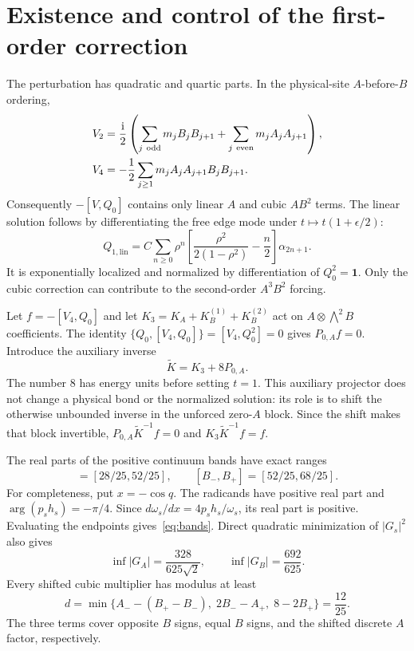\documentclass[11pt,a4paper]{article}
\newcommand{\ii}{\mathrm{i}}
\newcommand{\Id}{\mathbf{1}}
\begin{document}
\section{Existence and control of the first-order correction}
The perturbation has quadratic and quartic parts. In the physical-site
$A$-before-$B$ ordering,
\begin{align}
 V_2&=\frac{\ii}{2}\left(\sum_{j\ \text{odd}}m_j B_jB_{j+1}
                 +\sum_{j\ \text{even}}m_j A_jA_{j+1}\right),\notag\\
 V_4&=-\frac12\sum_{j\geq1}m_j A_jA_{j+1}B_jB_{j+1}.\label{eq:v4}
\end{align}
Consequently $-[V,Q_0]$ contains only linear $A$ and cubic $AB^2$ terms.
The linear solution follows by differentiating the free edge mode under
$t\mapsto t(1+\epsilon/2)$:
\begin{equation}
 Q_{1,\mathrm{lin}}=
 C\sum_{n\geq0}\rho^n
 \left[\frac{\rho^2}{2(1-\rho^2)}-\frac n2\right]\alpha_{2n+1}.
 \label{eq:linear}
\end{equation}
It is exponentially localized and normalized by differentiation of
$Q_0^2=\Id$. Only the cubic correction can contribute to the
second-order $A^3B^2$ forcing.

Let $f=-[V_4,Q_0]$ and let $K_3=K_A+K_B^{(1)}+K_B^{(2)}$ act on
$A\otimes\bigwedge^2B$ coefficients. The identity
$\{Q_0,[V_4,Q_0]\}=[V_4,Q_0^2]=0$ gives $P_{0,A}f=0$.
Introduce the auxiliary inverse
\begin{equation}
 \widetilde K=K_3+8P_{0,A}.\label{eq:mass}
\end{equation}
The number $8$ has energy units before setting $t=1$. This auxiliary
projector does not change a physical bond or the normalized solution: its
role is to shift the otherwise unbounded inverse in the unforced
zero-$A$ block. Since the shift makes that block invertible,
$P_{0,A}\widetilde K^{-1}f=0$ and $K_3\widetilde K^{-1}f=f$.

The real parts of the positive continuum bands have exact ranges
\begin{equation}
 [A_-,A_+]=[28/25,52/25],\qquad
 [B_-,B_+]=[52/25,68/25].\label{eq:bands}
\end{equation}
For completeness, put $x=-\cos q$. The radicands have positive real part
and $\arg(p_sh_s)=-\pi/4$. Since
$d\omega_s/dx=4p_sh_s/\omega_s$, its real part is positive.
Evaluating the endpoints gives~\eqref{eq:bands}. Direct quadratic
minimization of $|G_s|^2$ also gives
\begin{equation}
 \inf|G_A|=\frac{328}{625\sqrt2},\qquad
 \inf|G_B|=\frac{692}{625}.\label{eq:gmin}
\end{equation}
Every shifted cubic multiplier has modulus at least
\begin{equation}
 d=\min\{A_--(B_+-B_-),\;2B_--A_+,\;8-2B_+\}=\frac{12}{25}.
 \label{eq:gap}
\end{equation}
The three terms cover opposite $B$ signs, equal $B$ signs, and the
shifted discrete $A$ factor, respectively.
\end{document}
